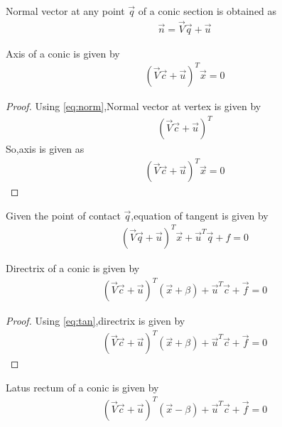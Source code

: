 \documentclass[journal,12pt,twocolumn]{IEEEtran}
\begin{document}
\begin{lemma}
Normal vector at any point $\vec{q}$ of a conic section is obtained as 
\begin{align}
    \vec{n}=\vec{V}\vec{q} + \vec{u}
\end{align}
\label{eq:norm}
\end{lemma}

\begin{lemma}
Axis of a conic is given by
\begin{align}
(\vec{V}\vec{c}+\vec{u})^{T}\vec{x} = 0 \label{eq:axis}
\end{align}
\end{lemma}

\begin{proof}
Using \eqref{eq:norm},Normal vector at vertex is given by 
\begin{align}
    (\vec{V}\vec{c} + \vec{u})^T
\end{align}
So,axis is given as 
\begin{align}
    (\vec{V}\vec{c}+\vec{u})^{T}\vec{x} = 0
\end{align}
\end{proof}

\begin{lemma}
Given the point of contact $\vec{q}$,equation of tangent is given by
\begin{align}
    (\vec{V}\vec{q} + \vec{u})^T\vec{x} + \vec{u}^T\vec{q} + f = 0 \label{eq:tan}
\end{align}
\end{lemma}

\begin{lemma}
Directrix of a conic is given by
\begin{align}
(\vec{V}\vec{c}+\vec{u})^T(\vec{x} +\beta) + \vec{u}^T\vec{c} + \vec{f} = 0 \label{eq:directrix}
\end{align}
\end{lemma}

\begin{proof}
Using \eqref{eq:tan},directrix is given by
\begin{align}
    (\vec{V}\vec{c}+\vec{u})^T(\vec{x} +\beta) + \vec{u}^T\vec{c} + \vec{f} = 0
\end{align}
\end{proof}

\begin{lemma}
Latus rectum of a conic is given by 
\begin{align}
(\vec{V}\vec{c}+\vec{u})^T(\vec{x} -\beta) + \vec{u}^T\vec{c} + \vec{f} = 0 \label{eq:latus}
\end{align}
\end{lemma}
\end{document}
